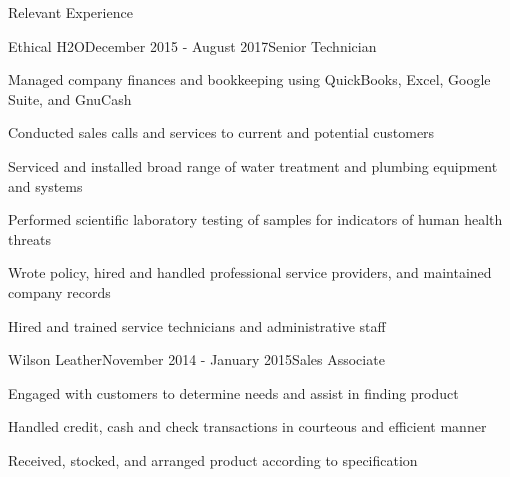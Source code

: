 \documentclass{resume} %
\begin{document}
\begin{rSection}{Relevant Experience}

\begin{rWorkSubsection}{Ethical H2O}{December 2015 - August 2017}{Senior Technician}{}
\item Managed company finances and bookkeeping using QuickBooks, Excel, Google Suite, and GnuCash
\item Conducted sales calls and services to current and potential customers
\item Serviced and installed broad range of water treatment and plumbing equipment and systems
\item Performed scientific laboratory testing of samples for indicators of human health threats
\item Wrote policy, hired and handled professional service providers, and maintained company records
\item Hired and trained service technicians and administrative staff
\end{rWorkSubsection}


\begin{rWorkSubsection}{Wilson Leather}{November 2014 - January 2015}{Sales Associate}{}
\item Engaged with customers to determine needs and assist in finding product
\item Handled credit, cash and check transactions in courteous and efficient manner
\item Received, stocked, and arranged product according to specification
\end{rWorkSubsection}



\end{rSection}
\end{document}
